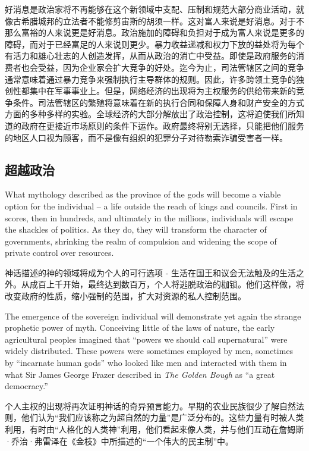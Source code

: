 \begin{Parallel}{97mm}{45mm}
  \ParallelRText
  {\small 好消息是政治家将不再能够在这个新领域中支配、压制和规范大部分商业活动，就像古希腊城邦的立法者不能修剪宙斯的胡须一样。这对富人来说是好消息。对于不那么富裕的人来说更是好消息。政治施加的障碍和负担对于成为富人来说是更多的障碍，而对于已经富足的人来说则更少。暴力收益递减和权力下放的益处将为每个有活力和雄心壮志的人创造发挥，从而从政治的消亡中受益。即使是政府服务的消费者也会受益，因为企业家会扩大竞争的好处。迄今为止，司法管辖区之间的竞争通常意味着通过暴力竞争来强制执行主导群体的规则。因此，许多跨领土竞争的独创性都集中在军事事业上。但是，网络经济的出现将为主权服务的供给带来新的竞争条件。司法管辖区的繁殖将意味着在新的执行合同和保障人身和财产安全的方式方面的多种多样的实验。全球经济的大部分解放出了政治控制，这将迫使我们所知道的政府在更接近市场原则的条件下运作。政府最终将别无选择，只能把他们服务的地区人口视为顾客，而不是像有组织的犯罪分子对待勒索诈骗受害者一样。 }
  \ParallelPar
  
\subsection{超越政治}
  
  \ParallelLText
  {What mythology described as the province of the gods will become a viable option for the individual -- a life outside the reach of kings and councils. First in scores, then in hundreds, and ultimately in the millions, individuals will escape the shackles of politics. As they do, they will transform the character of governments, shrinking the realm of compulsion and widening the scope of private control over resources.}

  \ParallelRText
  {\small 神话描述的神的领域将成为个人的可行选项 - 生活在国王和议会无法触及的生活之外。从成百上千开始，最终达到数百万，个人将逃脱政治的枷锁。他们这样做，将改变政府的性质，缩小强制的范围，扩大对资源的私人控制范围。}

\ParallelPar 
\ParallelLText
  {The emergence of the sovereign individual will demonstrate yet again the strange prophetic power of myth. Conceiving little of the laws of nature, the early agricultural peoples imagined that “powers we should call supernatural” were widely distributed. These powers were sometimes employed by men, sometimes by “incarnate human gods” who looked like men and interacted with them in what Sir James George Frazer described in \emph{The Golden Bough} as “a great democracy.”  }
  
  \ParallelRText
  {\small 个人主权的出现将再次证明神话的奇异预言能力。早期的农业民族很少了解自然法则，他们认为“我们应该称之为超自然的力量”是广泛分布的。这些力量有时被人类利用，有时由“人格化的人类神”利用，他们看起来像人类，并与他们互动在詹姆斯·乔治·弗雷泽在《金枝》中所描述的“一个伟大的民主制”中。}


\end{Parallel}
